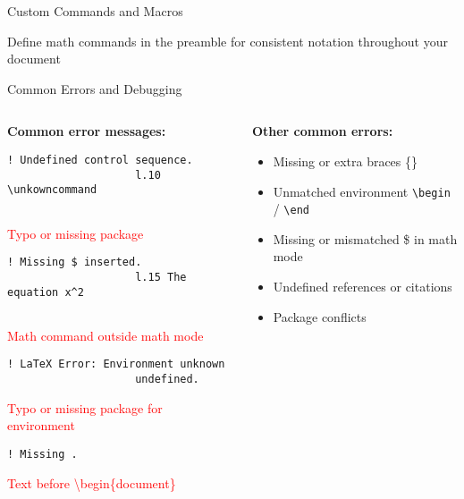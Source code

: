 \begin{frame}[fragile]{Custom Commands and Macros}
     \begin{tip}
          Define math commands in the preamble for consistent notation throughout your document
     \end{tip}
\end{frame}

\begin{frame}[fragile]{Common Errors and Debugging}
     \begin{columns}
          \begin{column}{0.5\textwidth}
               \textbf{Common error messages:}
               
               \begin{lstlisting}[language={}]
                    ! Undefined control sequence.
                    l.10 \unkowncommand
                    
               \end{lstlisting}
               \textcolor{red}{Typo or missing package}
               
               \begin{lstlisting}[language={}]
                    ! Missing $ inserted.
                    l.15 The equation x^2
                    
               \end{lstlisting}
               \textcolor{red}{Math command outside math mode}
               
               \begin{lstlisting}[language={}]
                    ! LaTeX Error: Environment unknown 
                    undefined.
               \end{lstlisting}
               \textcolor{red}{Typo or missing package for environment}
               
               \begin{lstlisting}[language={}]
                    ! Missing .
                    \end{lstlisting}
                    \textcolor{red}{Text before \textbackslash begin\{document\}}
               \end{column}
               
               \begin{column}{0.5\textwidth}
                    \textbf{Other common errors:}
                    \begin{itemize}
                         \item Missing or extra braces \{\}
                         \item Unmatched environment \texttt{\textbackslash begin} / \texttt{\textbackslash end}
                         \item Missing or mismatched \$ in math mode
                         \item Undefined references or citations
                         \item Package conflicts
                    \end{itemize}
                    

\end{column}
\end{columns}
\end{frame}
